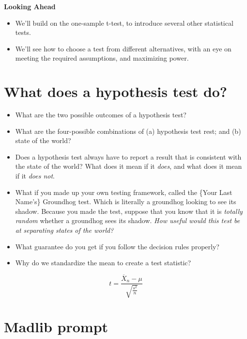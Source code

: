 \documentclass[
]{book}
\providecommand{\tightlist}{%
  \setlength{\itemsep}{0pt}\setlength{\parskip}{0pt}}
\theoremstyle{definition}
\theoremstyle{definition}
\theoremstyle{definition}
\theoremstyle{definition}
\theoremstyle{remark}
\begin{document}
\textbf{Looking Ahead}

\begin{itemize}
\tightlist
\item
  We'll build on the one-sample t-test, to introduce several other statistical tests.
\item
  We'll see how to choose a test from different alternatives, with an eye on meeting the required assumptions, and maximizing power.
\end{itemize}

\hypertarget{what-does-a-hypothesis-test-do}{%
\section{What does a hypothesis test do?}\label{what-does-a-hypothesis-test-do}}

\begin{itemize}
\tightlist
\item
  What are the two possible outcomes of a hypothesis test?
\item
  What are the four-possible combinations of (a) hypothesis test rest; and (b) state of the world?
\item
  Does a hypothesis test always have to report a result that is consistent with the state of the world? What does it mean if it \emph{does}, and what does it mean if it \emph{does not}.
\item
  What if you made up your own testing framework, called the \{Your Last Name's\} Groundhog test. Which is literally a groundhog looking to see its shadow. Because you made the test, suppose that you know that it is \emph{totally random} whether a groundhog sees its shadow. \emph{How useful would this test be at separating states of the world?}\\
\item
  What guarantee do you get if you follow the decision rules properly?
\item
  Why do we standardize the mean to create a test statistic?
\end{itemize}

\[ 
  t = \frac{ \overline{X}_n - \mu}{\sqrt{\frac{s^2}{n}}}
\]

\hypertarget{madlib-prompt}{%
\section{Madlib prompt}\label{madlib-prompt}}
\end{document}
